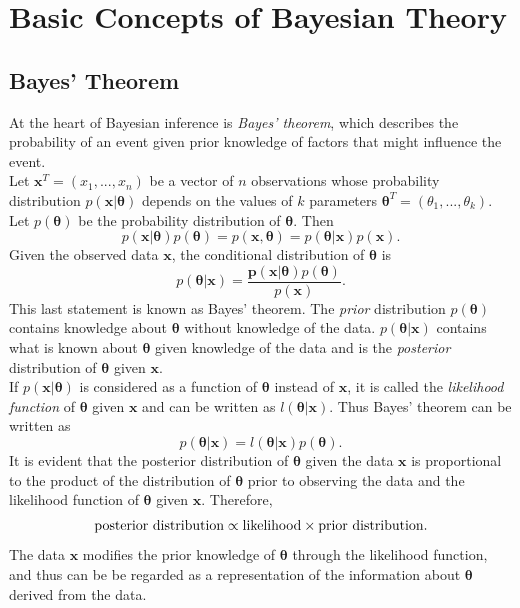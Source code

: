 \section{Basic Concepts of Bayesian Theory}
\subsection{Bayes' Theorem}
At the heart of Bayesian inference is \textit{Bayes' theorem}, which describes the probability of an event given prior knowledge of factors that might influence the event. \\
Let $\pmb{x}^T=\left(x_1,...,x_n\right)$ be a vector of $n$ observations whose probability distribution $p\left(\pmb{x}|\pmb{\theta}\right)$ depends on the values of $k$ parameters $\pmb{\theta}^T=\left(\theta_1,...,\theta_k\right)$. Let $p\left(\pmb{\theta}\right)$ be the probability distribution of $\pmb{\pmb{\theta}}$. Then 
\begin{equation}
    p\left(\pmb{x}|\pmb{\theta}\right)p\left(\pmb{\theta}\right)=p\left(\pmb{x},\pmb{\theta}\right) = p\left(\pmb{\theta}|\pmb{x}\right)p\left(\pmb{x}\right).
\end{equation}
Given the observed data $\pmb{x}$, the conditional distribution of $\pmb{\theta}$ is
\begin{equation}
    p\left(\pmb{\theta}|\pmb{x}\right)=\frac{\pmb{p}\left(\pmb{x}|\pmb{\theta}\right)p\left(\pmb{\theta}\right)}{p\left(\pmb{x}\right)}.
\end{equation}
This last statement is known as Bayes' theorem. The \textit{prior} distribution $p\left(\pmb{\theta}\right)$ contains knowledge about $\pmb{\theta}$ without knowledge of the data. $p\left(\pmb{\theta}|\pmb{x}\right)$ contains what is known about $\pmb{\theta}$ given knowledge of the data and is the \textit{posterior} distribution of $\pmb{\theta}$ given $\pmb{x}$. \\
If $p\left(\pmb{x}|\pmb{\theta}\right)$ is considered as a function of $\pmb{\theta}$ instead of $\pmb{x}$, it is called the \textit{likelihood function} of $\pmb{\theta}$ given $\pmb{x}$ and can be written as $l\left(\pmb{\theta}|\pmb{x}\right)$. Thus Bayes' theorem can be written as
\begin{equation}
    p\left(\pmb{\theta}|\pmb{x}\right)=l\left(\pmb{\theta}|\pmb{x}\right)p\left(\pmb{\theta}\right).
\end{equation}
It is evident that the posterior distribution of $\pmb{\theta}$ given the data $\pmb{x}$ is proportional to the product of the distribution of $\pmb{\theta}$ prior to observing the data and the likelihood function of $\pmb{\theta}$ given $\pmb{x}$. Therefore,
\begin{equation*}
    \hbox{posterior distribution} \propto  \hbox{likelihood}\times\hbox{prior distribution}.
\end{equation*}
The data $\pmb{x}$ modifies the prior knowledge of $\pmb{\theta}$ through the likelihood function, and thus can be be regarded as a representation of the information about  $\pmb{\theta}$ derived from the data\autocite[Cf.][]{box2011bayesian}.
